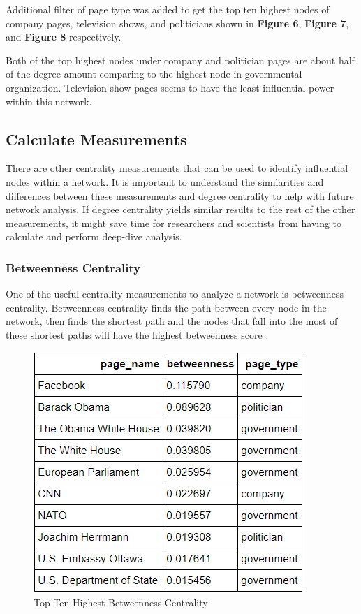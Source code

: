 \documentclass[11pt,twocolumn]{article}
\begin{document}
Additional filter of page type was added to get the top ten highest nodes of company pages, television shows, and politicians shown in \textbf{Figure 6}, \textbf{Figure 7}, and \textbf{Figure 8} respectively.  

Both of the top highest nodes under company and politician pages are about half of the degree amount comparing to the highest node in governmental organization. Television show pages seems to have the least influential power within this network.

\subsection{Calculate Measurements }
There are other centrality measurements that can be used to identify influential nodes within a network. It is important to understand the similarities and differences between these measurements and degree centrality to help with future network analysis. If degree centrality yields similar results to the rest of the other measurements, it might save time for researchers and scientists from having to calculate and perform deep-dive analysis.

\subsubsection{Betweenness Centrality} 
One of the useful centrality measurements to analyze a network is betweenness centrality. Betweenness centrality finds the path between every node in the network, then finds the shortest path and the nodes that fall into the most of these shortest paths will have the highest betweenness score \cite{newman2008mathematics}. 

\begin{figure}[hbt!]
\includegraphics[scale=0.5]{top_ten_betweennness.png} 
\caption{Top Ten Highest Betweenness Centrality}
\end{figure}
\end{document}
